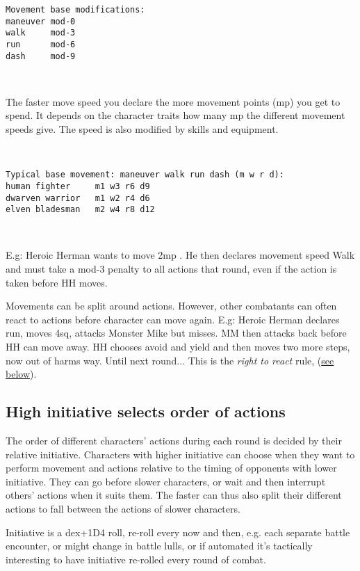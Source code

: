 \small \begin{verbatim}
Movement base modifications:
maneuver mod-0
walk     mod-3
run      mod-6
dash     mod-9
\end{verbatim} \normalsize

\

The faster move speed you declare the more movement points (mp) you get to spend. It depends on the character traits how many mp the different movement speeds give. The speed is also modified by skills and equipment.

\

\small \begin{verbatim}
Typical base movement: maneuver walk run dash (m w r d):
human fighter     m1 w3 r6 d9
dwarven warrior   m1 w2 r4 d6
elven bladesman   m2 w4 r8 d12
\end{verbatim} \normalsize

\

E.g: Heroic Herman wants to move 2mp . He then declares movement speed Walk and must take a mod-3 penalty to all actions that round, even if the action is taken before HH moves.

Movements can be split around actions. However, other combatants can often react to actions before character can move again. E.g: Heroic Herman declares run, moves 4sq, attacks Monster Mike but misses. MM then attacks back before HH can move away. HH chooses avoid and yield and then moves two more steps, now out of harms way. Until next round... This is the \emph{right to react} rule, (\hyperref[righttoreact]{see below}).


\subsection*{High initiative selects order of actions}
The order of different characters' actions during each round is decided by their relative initiative. Characters with higher initiative can choose when they want to perform movement and actions relative to the timing of opponents with lower initiative. They can go before slower characters, or wait and then interrupt others' actions when it suits them. The faster can thus also split their different actions to fall between the actions of slower characters.

Initiative is a dex+1D4 roll, re-roll every now and then, e.g. each separate battle encounter, or might change in battle lulls, or if automated it's tactically interesting to have initiative re-rolled every round of combat.

